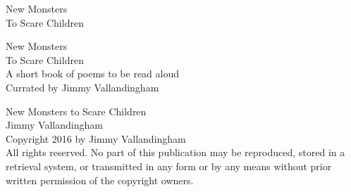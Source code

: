 \documentclass[12pt]{book}
\newcommand\blankpage{%
    \null
    \thispagestyle{empty}%
    \addtocounter{page}{-1}%
    \newpage}
\begin{document}




  \pagestyle{empty}
  \vspace*{\fill}
  \begin{center}
  \huge{\textsf{New Monsters}}\\
  \huge{\textsf{To Scare Children}}\\[0.5cm]
  \end{center}
  \vspace*{\fill}

  \begin{titlepage}
    \vspace*{\fill}
    \begin{center}
      \huge{\textsf{New Monsters}}\\
      \huge{\textsf{To Scare Children}}\\[0.5cm]
      \vspace*{\fill}
      \large {A short book of poems to be read aloud}\\[0.4cm]
      \large {Currated by Jimmy Vallandingham}\\[0.4cm]
    \end{center}
    \vspace*{\fill}
  \end{titlepage}

  \begingroup
  \footnotesize
  \parindent 0pt
  \parskip \baselineskip
  \vfill
  New Monsters to Scare Children\\
  Jimmy Vallandingham \\


  Copyright \textcopyright{} 2016 by Jimmy Vallandingham \\

  All rights reserved. No part of this publication may be reproduced, stored in a retrieval system, or transmitted in any form or by any means without prior written permission of the copyright owners.
\end{document}
